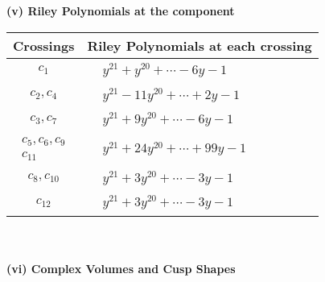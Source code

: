 \documentclass[1p]{elsarticle_modified}
\theoremstyle{definition}
\begin{document}
\newpage\renewcommand{\arraystretch}{1}
\flushleft \textbf{(v) Riley Polynomials at the component}\newline \\
\begin{tabular}{m{50pt}|m{274pt}}
Crossings & \hspace{64pt}Riley Polynomials at each crossing \\
\hline $$\begin{aligned}c_{1}\end{aligned}$$&$\begin{aligned}
&y^{21}+y^{20}+\cdots-6 y-1
\end{aligned}$\\
\hline $$\begin{aligned}c_{2},c_{4}\end{aligned}$$&$\begin{aligned}
&y^{21}-11 y^{20}+\cdots+2 y-1
\end{aligned}$\\
\hline $$\begin{aligned}c_{3},c_{7}\end{aligned}$$&$\begin{aligned}
&y^{21}+9 y^{20}+\cdots-6 y-1
\end{aligned}$\\
\hline $$\begin{aligned}c_{5},c_{6},c_{9}\\c_{11}\end{aligned}$$&$\begin{aligned}
&y^{21}+24 y^{20}+\cdots+99 y-1
\end{aligned}$\\
\hline $$\begin{aligned}c_{8},c_{10}\end{aligned}$$&$\begin{aligned}
&y^{21}+3 y^{20}+\cdots-3 y-1
\end{aligned}$\\
\hline $$\begin{aligned}c_{12}\end{aligned}$$&$\begin{aligned}
&y^{21}+3 y^{20}+\cdots-3 y-1
\end{aligned}$\\
\hline
\end{tabular}\\~\\
\newpage\flushleft \textbf{(vi) Complex Volumes and Cusp Shapes}
\end{document}
